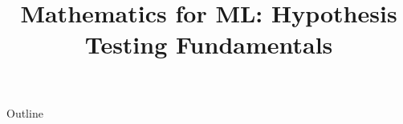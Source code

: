 \documentclass[xcolor=dvipsnames,compress,t,pdf,9pt]{beamer}
\title[\insertframenumber /\inserttotalframenumber]{Mathematics for ML: Hypothesis Testing Fundamentals}
\begin{document}
	\begin{frame}
	\titlepage
	\end{frame}

	\begin{frame}{Outline}
	    \tableofcontents
	\end{frame}

	
	
	
	
\end{document}
